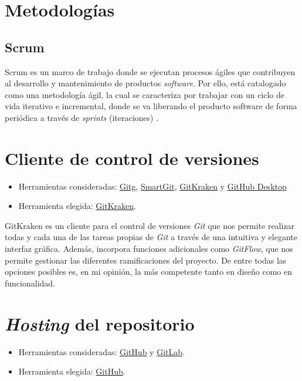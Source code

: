 
\section{Metodologías}\label{metodologias}

\subsection{Scrum}\label{scrum}

Scrum es un marco de trabajo donde se ejecutan procesos ágiles que contribuyen al desarrollo y mantenimiento de productos \emph{software}. Por ello, está catalogado como una metodología ágil, la cual se caracteriza por trabajar con un ciclo de vida iterativo e incremental, donde se va liberando el producto software de forma periódica a través de \emph{sprints} (iteraciones) \cite{agile:scrum}.

\section{Cliente de control de versiones}\label{ctr-ver}
\begin{itemize}
\tightlist
	\item Herramientas consideradas:
 		\href{https://wiki.gnome.org/Apps/Gitg/}{Gitg},
  		\href{https://www.syntevo.com/smartgit/}{SmartGit},
  		\href{https://www.gitkraken.com/}{GitKraken} y
  		\href{https://desktop.github.com/}{GitHub Desktop}
	\item Herramienta elegida: \href{https://www.gitkraken.com/}{GitKraken}.
\end{itemize}

GitKraken es un cliente para el control de versiones \emph{Git} que nos permite realizar todas y cada una de las tareas propias de \emph{Git} a través de una intuitiva y elegante interfaz gráfica. Además, incorpora funciones adicionales como \emph{GitFlow}, que nos permite gestionar las diferentes ramificaciones del proyecto. De entre todas las opciones posibles es, en mi opinión, la más competente tanto en diseño como en funcionalidad.

\section{\emph{Hosting} del repositorio}\label{rep-host}
\begin{itemize}
\tightlist
	\item Herramientas consideradas: \href{https://github.com/}{GitHub} y
  		\href{https://gitlab.com/}{GitLab}.
	\item Herramienta elegida: \href{https://github.com/}{GitHub}.
\end{itemize}


